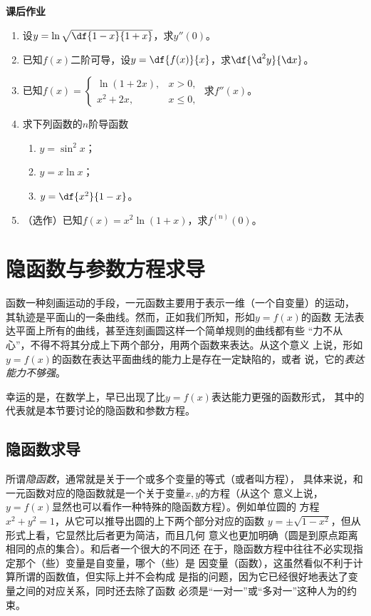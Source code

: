 \begin{ext}
	{\centering\bf 课后作业}
	
	\begin{enumerate}
	  \item 设$y=\ln\sqrt{\df{1-x}{1+x}}$，求$y''(0)$。
	  \item 已知$f(x)$二阶可导，设$y=\df{f(x)}{x}$，求$\df{\d^2y}{\d x}$。
	  \item 已知$f(x)=\left\{\begin{array}{ll}
	  	\ln(1+2x),& x>0, \\ x^2+2x, & x\leq 0,
	  \end{array}\right.$
	  求$f''(x)$。
	  \item 求下列函数的$n$阶导函数
	  \begin{enumerate}[(1)]
	    \item $y=\sin^2x$；
	    \item $y=x\ln x$；
	    \item $y=\df{x^2}{1-x}$。
	  \end{enumerate}
	  \item （选作）已知$f(x)=x^2\ln(1+x)$，求$f^{(n)}(0)$。
	\end{enumerate}
\end{ext}

\section{隐函数与参数方程求导}

函数一种刻画运动的手段，一元函数主要用于表示一维（一个自变量）的运动，
其轨迹是平面山的一条曲线。然而，正如我们所知，形如$y=f(x)$的函数
无法表达平面上所有的曲线，甚至连刻画圆这样一个简单规则的曲线都有些
“力不从心”，不得不将其分成上下两个部分，用两个函数来表达。从这个意义
上说，形如$y=f(x)$的函数在表达平面曲线的能力上是存在一定缺陷的，或者
说，它的{\it 表达能力不够强}。

幸运的是，在数学上，早已出现了比$y=f(x)$表达能力更强的函数形式，
其中的代表就是本节要讨论的隐函数和参数方程。

\subsection{隐函数求导}

所谓{\it 隐函数}，通常就是关于一个或多个变量的等式（或者叫方程），
具体来说，和一元函数对应的隐函数就是一个关于变量$x,y$的方程（从这个
意义上说，$y=f(x)$显然也可以看作一种特殊的隐函数方程）。例如单位圆的
方程$x^2+y^2=1$，从它可以推导出圆的上下两个部分对应的函数
$y=\pm\sqrt{1-x^2}$，但从形式上看，它显然比后者更为简洁，而且几何
意义也更加明确（圆是到原点距离相同的点的集合）。和后者一个很大的不同还
在于，隐函数方程中往往不必实现指定那个（些）变量是自变量，哪个（些）是
因变量（函数），这虽然看似不利于计算所谓的函数值，但实际上并不会构成
是指的问题，因为它已经很好地表达了变量之间的对应关系，同时还去除了函数
必须是“一对一”或“多对一”这种人为的约束。

